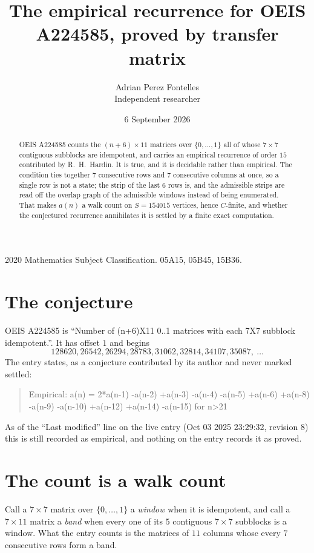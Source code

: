 \documentclass[11pt,a4paper]{article}
\title{The empirical recurrence for OEIS A224585, proved by transfer matrix}
\author{Adrian Perez Fontelles\\ \small Independent researcher}
\date{6 September 2026}
\theoremstyle{plain}
\theoremstyle{definition}
\begin{document}
\maketitle

\begin{abstract}
OEIS A224585 counts the $(n+6)\times11$ matrices over $\{0,\dots,1\}$ all of whose
$7\times7$ contiguous subblocks are idempotent, and carries an empirical recurrence of order
$15$ contributed by R.~H.~Hardin. It is true, and it is decidable rather than empirical.
The condition ties together $7$ consecutive rows and $7$ consecutive columns at once, so a
single row is not a state; the strip of the last $6$ rows is, and the admissible strips
are read off the overlap graph of the admissible windows instead of being enumerated. That
makes $a(n)$ a walk count on $S=154015$ vertices, hence $C$-finite, and whether the conjectured
recurrence annihilates it is settled by a finite exact computation.
\end{abstract}

\noindent\small 2020 Mathematics Subject Classification. 05A15, 05B45, 15B36.\normalsize

\section{The conjecture}

OEIS A224585 is ``Number of (n+6)X11 0..1 matrices with each 7X7 subblock idempotent.''. It has offset $1$ and begins
\[
128620, 26542, 26294, 28783, 31062, 32814, 34107, 35087,\ \dots
\]
The entry states, as a conjecture contributed by its author and never marked settled:
\begin{quote}
Empirical: a(n) = 2*a(n-1) -a(n-2) +a(n-3) -a(n-4) -a(n-5) +a(n-6) +a(n-8) -a(n-9) -a(n-10) +a(n-12) +a(n-14) -a(n-15) for n>21
\end{quote}
As of the ``Last modified'' line on the live entry (Oct 03 2025 23:29:32, revision 8) this is still
recorded as empirical, and nothing on the entry records it as proved.

\section{The count is a walk count}

Call a $7\times7$ matrix over $\{0,\dots,1\}$ a \emph{window} when it is idempotent, and
call a $7\times11$ matrix a \emph{band} when every one of its $5$ contiguous
$7\times7$ subblocks is a window. What the entry counts is the matrices of $11$ columns
whose every $7$ consecutive rows form a band.
\end{document}
